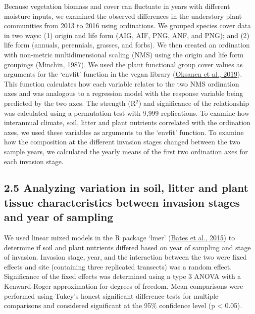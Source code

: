 \documentclass[
  11pt,
  a4paper,
]{article}
\begin{document}
Because vegetation biomass and cover can fluctuate in years with different moisture inputs, we examined the observed differences in the understory plant communities from 2013 to 2016 using ordinations. We grouped species cover data in two ways: (1) origin and life form (AIG, AIF, PNG, ANF, and PNG); and (2) life form (annuals, perennials, grasses, and forbs). We then created an ordination with non-metric multidimensional scaling (NMS) using the origin and life form groupings (\protect\hyperlink{ref-Minchin1987}{Minchin, 1987}). We used the plant functional group cover values as arguments for the `envfit' function in the vegan library (\protect\hyperlink{ref-Oksanen2019}{Oksanen et al., 2019}). This function calculates how each variable relates to the two NMS ordination axes and was analogous to a regression model with the response variable being predicted by the two axes. The strength (R\(^2\)) and significance of the relationship was calculated using a permutation test with 9,999 replications. To examine how interannual climate, soil, litter and plant nutrients correlated with the ordination axes, we used these variables as arguments to the `envfit' function. To examine how the composition at the different invasion stages changed between the two sample years, we calculated the yearly means of the first two ordination axes for each invasion stage.

\hypertarget{analyzing-variation-in-soil-litter-and-plant-tissue-characteristics-between-invasion-stages-and-year-of-sampling}{%
\subsection{2.5 Analyzing variation in soil, litter and plant tissue characteristics between invasion stages and year of sampling}\label{analyzing-variation-in-soil-litter-and-plant-tissue-characteristics-between-invasion-stages-and-year-of-sampling}}

We used linear mixed models in the R package `lmer' (\protect\hyperlink{ref-Bates2015}{Bates et al., 2015}) to determine if soil and plant nutrients differed based on year of sampling and stage of invasion. Invasion stage, year, and the interaction between the two were fixed effects and site (containing three replicated transects) was a random effect. Significance of the fixed effects was determined using a type 3 ANOVA with a Kenward-Roger approximation for degrees of freedom. Mean comparisons were performed using Tukey's honest significant difference tests for multiple comparisons and considered significant at the 95\% confidence level (p \textless{} 0.05).
\end{document}
